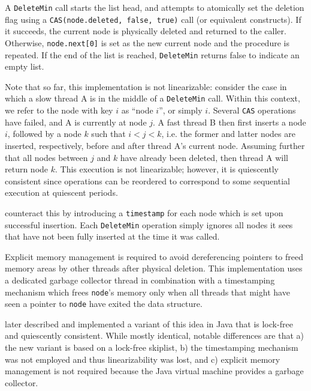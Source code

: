 \documentclass[a4paper,10pt]{article}
\begin{document}
A \lstinline|DeleteMin| call starts the list head, and attempts to atomically set
the deletion flag using a \lstinline|CAS(node.deleted, false, true)| call (or equivalent constructs).
If it succeeds, the current node is physically deleted and returned to the caller. Otherwise,
\lstinline|node.next[0]| is set as the new current node and the procedure is repeated.
If the end of the list is reached, \lstinline|DeleteMin| returns false to indicate an empty list.


Note that so far, this implementation is not linearizable: consider the case in which a
slow thread A is in the middle of a \lstinline|DeleteMin| call. Within this context, we refer to 
the node with key $i$ as ``node $i$'', or simply $i$. Several \lstinline|CAS|
operations have failed, and A is currently at node $j$.
A fast thread B then first inserts a node $i$, followed by a node $k$ such that
$i < j < k$, i.e. the former and latter nodes are inserted, respectively, before and after
thread A's current node. Assuming further that all nodes between $j$ and $k$ have already
been deleted, then thread A will return node $k$. This execution is not linearizable; however,
it is quiescently consistent since operations can be reordered to correspond to some sequential
execution at quiescent periods.

\citeauthor{shavit2000skiplist} counteract this by introducing a \lstinline|timestamp| for each
node which is set upon successful insertion. Each \lstinline|DeleteMin| operation 
simply ignores all nodes it sees that have not been fully inserted at the time it was called.


Explicit memory management is required to avoid dereferencing pointers to freed memory areas
by other threads after physical deletion. This implementation uses a dedicated garbage collector
thread in combination with a timestamping mechanism which frees \lstinline|node|'s memory only
when all threads that might have seen a pointer to \lstinline|node| have exited the data structure.

\citeauthor{herlihy2012art} \cite{herlihy2012art} later described and implemented a variant of this idea 
in Java that is lock-free and quiescently consistent. While mostly identical, notable differences are
that a) the new variant is based on a lock-free skiplist, b) the timestamping mechanism was not
employed and thus linearizability was lost, and c) explicit memory management is not required
because the Java virtual machine provides a garbage collector.
\end{document}
